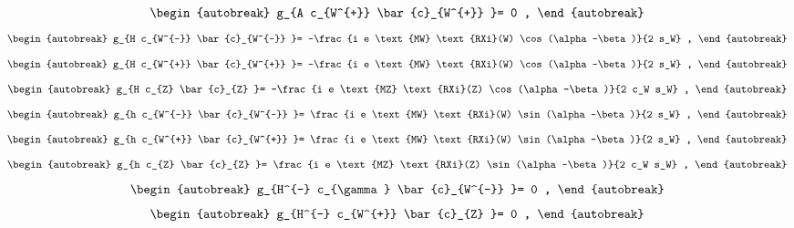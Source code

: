 \begin{align}
\begin{autobreak}
g_{A c_{W^{+}} \bar{c}_{W^{+}} }=
	0
	,
\end{autobreak}
\end{align}
\begin{align}
\begin{autobreak}
g_{H c_{W^{-}} \bar{c}_{W^{-}} }=
	-\frac{i e \text{MW} \text{RXi}(W) \cos (\alpha -\beta )}{2 s_W}
	,
\end{autobreak}
\end{align}
\begin{align}
\begin{autobreak}
g_{H c_{W^{+}} \bar{c}_{W^{+}} }=
	-\frac{i e \text{MW} \text{RXi}(W) \cos (\alpha -\beta )}{2 s_W}
	,
\end{autobreak}
\end{align}
\begin{align}
\begin{autobreak}
g_{H c_{Z} \bar{c}_{Z} }=
	-\frac{i e \text{MZ} \text{RXi}(Z) \cos (\alpha -\beta )}{2 c_W s_W}
	,
\end{autobreak}
\end{align}
\begin{align}
\begin{autobreak}
g_{h c_{W^{-}} \bar{c}_{W^{-}} }=
	\frac{i e \text{MW} \text{RXi}(W) \sin (\alpha -\beta )}{2 s_W}
	,
\end{autobreak}
\end{align}
\begin{align}
\begin{autobreak}
g_{h c_{W^{+}} \bar{c}_{W^{+}} }=
	\frac{i e \text{MW} \text{RXi}(W) \sin (\alpha -\beta )}{2 s_W}
	,
\end{autobreak}
\end{align}
\begin{align}
\begin{autobreak}
g_{h c_{Z} \bar{c}_{Z} }=
	\frac{i e \text{MZ} \text{RXi}(Z) \sin (\alpha -\beta )}{2 c_W s_W}
	,
\end{autobreak}
\end{align}
\begin{align}
\begin{autobreak}
g_{H^{-} c_{\gamma} \bar{c}_{W^{-}} }=
	0
	,
\end{autobreak}
\end{align}
\begin{align}
\begin{autobreak}
g_{H^{-} c_{W^{+}} \bar{c}_{Z} }=
	0
	,
\end{autobreak}
\end{align}
